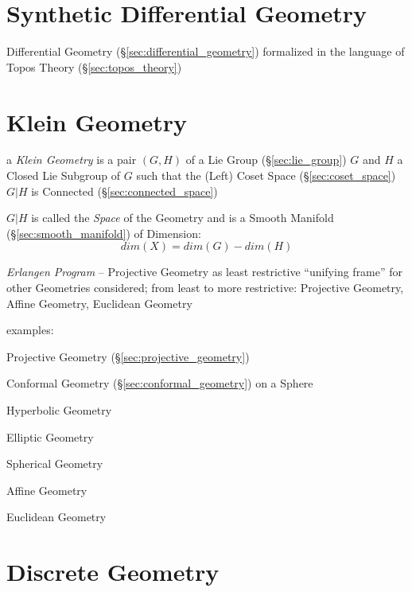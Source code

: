 \section{Synthetic Differential Geometry}
\label{sec:synthetic_differential_geometry}

Differential Geometry (\S\ref{sec:differential_geometry}) formalized in the
language of Topos Theory (\S\ref{sec:topos_theory})



\section{Klein Geometry}\label{sec:klein_geometry}


a \emph{Klein Geometry} is a pair $(G,H)$ of a Lie Group
(\S\ref{sec:lie_group}) $G$ and $H$ a Closed Lie Subgroup of $G$ such
that the (Left) Coset Space (\S\ref{sec:coset_space}) $G|H$ is
Connected (\S\ref{sec:connected_space})

$G|H$ is called the \emph{Space} of the Geometry and is a Smooth
Manifold (\S\ref{sec:smooth_manifold}) of Dimension:
\[
  dim(X) = dim(G) - dim(H)
\]

\emph{Erlangen Program} -- Projective Geometry as least restrictive
``unifying frame'' for other Geometries considered; from least to more
restrictive: Projective Geometry, Affine Geometry, Euclidean Geometry

examples: %

Projective Geometry (\S\ref{sec:projective_geometry})

Conformal Geometry (\S\ref{sec:conformal_geometry}) on a Sphere

Hyperbolic Geometry

Elliptic Geometry

Spherical Geometry

Affine Geometry

Euclidean Geometry



\section{Discrete Geometry}\label{sec:discrete_geometry}


